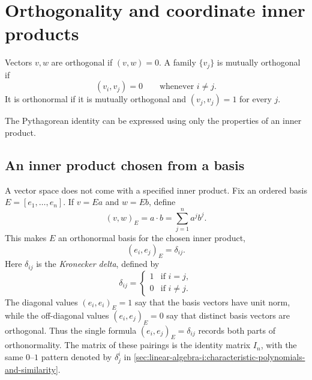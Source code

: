 \section{Orthogonality and coordinate inner products}
\label{sec:linear-algebra-i:orthogonality-and-coordinate-products}

\begin{definition}
  Vectors \(v,w\) are orthogonal if \((v,w)=0\). A family
  \(\{v_j\}\) is mutually orthogonal if
  \[
    (v_i,v_j)=0\qquad\text{whenever }i\ne j.
  \]
  It is orthonormal if it is mutually orthogonal and
  \((v_j,v_j)=1\) for every \(j\).
\end{definition}

The Pythagorean identity can be expressed using only the properties of
an inner product.


\subsection{An inner product chosen from a basis}

A vector space does not come with a specified inner product. Fix an
ordered basis \(E=[e_1,\ldots,e_n]\). If \(v=Ea\) and \(w=Eb\),
define
\[
  (v,w)_E=a\cdot b=\sum_{j=1}^n a^jb^j.
\]
This makes \(E\) an orthonormal basis for the chosen inner product,
\[
  (e_i,e_j)_E=\delta_{ij}.
\]
Here \(\delta_{ij}\) is the \emph{Kronecker delta}, defined by
\[
  \delta_{ij}=
  \begin{cases}
    1&\text{if }i=j,\\
    0&\text{if }i\ne j.
  \end{cases}
\]
The diagonal values \((e_i,e_i)_E=1\) say that the basis vectors
have unit norm, while the off-diagonal values \((e_i,e_j)_E=0\)
say that distinct basis vectors are orthogonal. Thus the single formula
\((e_i,e_j)_E=\delta_{ij}\) records both parts of orthonormality.
The matrix of these pairings is the identity matrix \(I_n\), with the
same \(0\)--\(1\) pattern denoted by \(\delta^i_j\) in
\autoref{sec:linear-algebra-i:characteristic-polynomials-and-similarity}.


